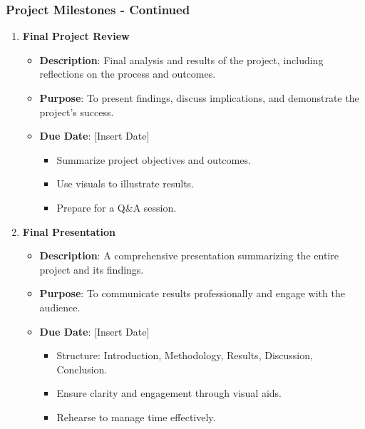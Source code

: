 \documentclass{beamer}
\begin{document}
\begin{frame}[fragile]
    \frametitle{Project Milestones - Continued}
    \begin{enumerate}[resume]
        \item \textbf{Final Project Review}
        \begin{itemize}
            \item \textbf{Description}: Final analysis and results of the project, including reflections on the process and outcomes.
            \item \textbf{Purpose}: To present findings, discuss implications, and demonstrate the project's success.
            \item \textbf{Due Date}: [Insert Date]
            \begin{itemize}
                \item Summarize project objectives and outcomes.
                \item Use visuals to illustrate results.
                \item Prepare for a Q\&A session.
            \end{itemize}
        \end{itemize}

        \item \textbf{Final Presentation}
        \begin{itemize}
            \item \textbf{Description}: A comprehensive presentation summarizing the entire project and its findings.
            \item \textbf{Purpose}: To communicate results professionally and engage with the audience.
            \item \textbf{Due Date}: [Insert Date]
            \begin{itemize}
                \item Structure: Introduction, Methodology, Results, Discussion, Conclusion.
                \item Ensure clarity and engagement through visual aids.
                \item Rehearse to manage time effectively.
            \end{itemize}
        \end{itemize}
    \end{enumerate}
\end{frame}
\end{document}
